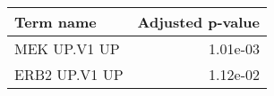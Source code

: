 \begin{tabular}{lr}
\toprule
    Term name &  Adjusted p-value \\
\midrule
 MEK UP.V1 UP &          1.01e-03 \\
ERB2 UP.V1 UP &          1.12e-02 \\
\bottomrule
\end{tabular}
